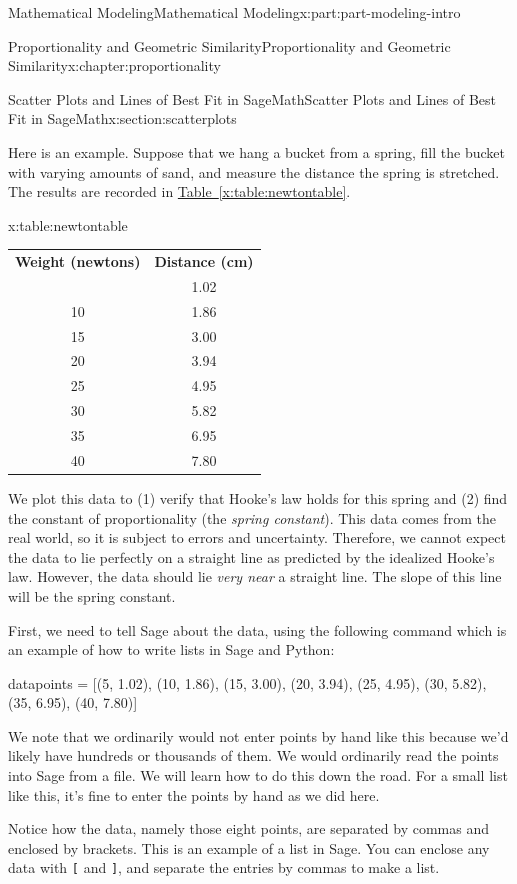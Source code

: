 \documentclass[oneside,10pt,]{book}
\newcommand{\tabularfont}{\relax}
\newcommand{\xreffont}{\relax}
\newcommand{\mono}[1]{\texttt{#1}}
\numberwithin{equation}{section}
\newcommand{\hrulethick} {\noalign{\hrule height 0.11em}}
\begin{document}
\begin{partptx}{Mathematical Modeling}{}{Mathematical Modeling}{}{}{x:part:part-modeling-intro}
\begin{chapterptx}{Proportionality and Geometric Similarity}{}{Proportionality and Geometric Similarity}{}{}{x:chapter:proportionality}
\begin{sectionptx}{Scatter Plots and Lines of Best Fit in SageMath}{}{Scatter Plots and Lines of Best Fit in SageMath}{}{}{x:section:scatterplots}
\par
Here is an example.  Suppose that we hang a bucket from a spring, fill the bucket with varying amounts of sand, and measure the distance the spring is stretched.  The results are recorded in \hyperref[x:table:newtontable]{Table~{\xreffont\ref{x:table:newtontable}}}.%
\par
\begin{tableptx}{\textbf{}}{x:table:newtontable}{}%
\centering%
{\tabularfont%
\begin{tabular}{ll}
\multicolumn{1}{c}{\textbf{Weight (newtons)}}&\multicolumn{1}{c}{\textbf{Distance (cm)}}\tabularnewline\hrulethick
\multicolumn{1}{c}{5}&\multicolumn{1}{c}{1.02}\tabularnewline[0pt]
\multicolumn{1}{c}{10}&\multicolumn{1}{c}{1.86}\tabularnewline[0pt]
\multicolumn{1}{c}{15}&\multicolumn{1}{c}{3.00}\tabularnewline[0pt]
\multicolumn{1}{c}{20}&\multicolumn{1}{c}{3.94}\tabularnewline[0pt]
\multicolumn{1}{c}{25}&\multicolumn{1}{c}{4.95}\tabularnewline[0pt]
\multicolumn{1}{c}{30}&\multicolumn{1}{c}{5.82}\tabularnewline[0pt]
\multicolumn{1}{c}{35}&\multicolumn{1}{c}{6.95}\tabularnewline[0pt]
\multicolumn{1}{c}{40}&\multicolumn{1}{c}{7.80}
\end{tabular}
}%
\end{tableptx}%
%
\par
We plot this data to (1) verify that Hooke's law holds for this spring and (2) find the constant of proportionality (the \emph{spring constant}).  This data comes from the real world, so it is subject to errors and uncertainty.  Therefore, we cannot expect the data to lie perfectly on a straight line as predicted by the idealized Hooke's law.  However, the data should lie \emph{very near} a straight line.  The slope of this line will be the spring constant.%
\par
First, we need to tell Sage about the data, using the following command which is an example of how to write lists in Sage and Python:%
\begin{sageinput}
datapoints = [(5, 1.02), (10, 1.86), (15, 3.00), (20, 3.94), (25, 4.95), (30, 5.82), (35, 6.95), (40, 7.80)]
\end{sageinput}
We note that we ordinarily would not enter points by hand like this because we'd likely have hundreds or thousands of them.  We would ordinarily read the points into Sage from a file.  We will learn how to do this down the road.  For a small list like this, it's fine to enter the points by hand as we did here.%
\par
Notice how the data, namely those eight points, are separated by commas and enclosed by brackets. This is an example of a list in Sage.  You can enclose any data with \mono{[} and \mono{]}, and separate the entries by commas to make a list.%

\end{sectionptx}
\end{chapterptx}
\end{partptx}
\end{document}

